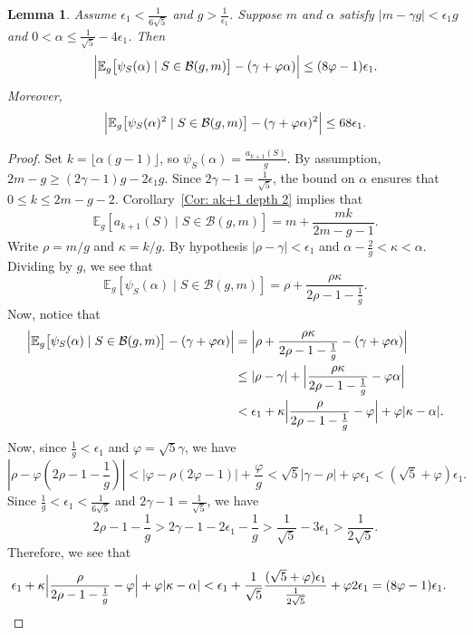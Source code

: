 \documentclass[12pt]{amsart}
\def\B{{\mathcal B}}
\def\E{{\mathbb E}}
\renewcommand{\phi}{\varphi}
\newtheorem{lemma}[theorem]{Lemma}
\begin{document}
\begin{lemma}\label{Lem: exp, var depth 2}
Assume $\epsilon_1< \frac{1}{6\sqrt{5}}$ and $g>\frac{1}{\epsilon_1}$.
Suppose $m$ and $\alpha$ satisfy $|m-\gamma g|<\epsilon_1 g$ and $0< \alpha \leq \frac{1}{\sqrt{5}} -4\epsilon_1$.
Then
\[
\Bigl|\E_g \big[\psi_S(\alpha)\mid S\in\mathcal B(g,m)\big]-(\gamma+\phi\alpha)\Bigr|
\leq (8\phi-1)\epsilon_1. \]
Moreover,
\[
\Bigl|\E_g \big[\psi_S(\alpha)^2\mid S\in\mathcal B(g,m)\big]-(\gamma+\phi\alpha)^2\Bigr|
\leq 68\epsilon_1. \]
\end{lemma}
\begin{proof}
Set $k=\lfloor \alpha (g-1)\rfloor$, so $\psi_S(\alpha)= \frac{a_{k+1}(S)}{g}$.  By assumption, $2m-g \ge (2\gamma-1)g - 2\epsilon_1 g$.  Since $2\gamma-1 = \frac{1}{\sqrt{5}}$, the bound on $\alpha$ ensures that $0\leq k\leq 2m-g-2$. 
Corollary~\ref{Cor: ak+1 depth 2} implies that
\[
\E_g[a_{k+1}(S)\mid S\in \B(g,m)] = m+\frac{mk}{2m-g-1}.
\]
Write $\rho=m/g$ and $\kappa=k/g$.  By hypothesis $|\rho-\gamma|<\epsilon_1$ and $\alpha-\frac{2}{g} <\kappa<\alpha$.
Dividing by $g$, we see that
\[
\E_g[\psi_S(\alpha)\mid S\in \B(g,m)]
= \rho+\frac{\rho\kappa}{2\rho-1-\frac{1}{g}}.
\]
Now, notice that
\begin{align*}
\Bigl|\E_g \big[\psi_S(\alpha)\mid S\in\mathcal B(g,m)\big]-(\gamma+\phi\alpha)\Bigr|
&= \Bigl| \rho+\frac{\rho \kappa}{2\rho-1-\frac{1}{g}} -(\gamma+\phi\alpha)\Bigr|\\
&\leq |\rho-\gamma| + \Bigl| \frac{\rho \kappa}{2\rho-1-\frac{1}{g}} -\phi\alpha\Bigr|\\
&<\epsilon_1 + \kappa\Bigl| \frac{\rho}{2\rho-1-\frac{1}{g}} -\phi\Bigr| 
+ \phi | \kappa - \alpha |.
\end{align*}
Now, since $\frac{1}{g}<\epsilon_1$ and $\phi=\sqrt{5}\gamma$, we have
\[
\left|\rho -\phi \left(2\rho-1-\frac{1}{g}\right)\right| < |\phi -\rho (2\phi-1)| + 
\frac{\phi}{g} 
< \sqrt{5}\left|\gamma -\rho \right|  +\phi\epsilon_1 < (\sqrt{5}+\phi)\epsilon_1.
\]
Since $\frac{1}{g}<\epsilon_1 < \frac{1}{6\sqrt{5}}$ and $2\gamma-1=\frac{1}{\sqrt{5}}$, we have
\[
2\rho-1-\frac{1}{g} > 2\gamma-1 -2\epsilon_1 -\frac{1}{g} >\frac{1}{\sqrt{5}} -3\epsilon_1 > \frac{1}{2\sqrt{5}}.
\]
Therefore, we see that
\begin{align*}
\epsilon_1 + \kappa\Bigl| \frac{\rho}{2\rho-1-\frac{1}{g}} -\phi\Bigr|  + \phi | \kappa - \alpha |
&< \epsilon_1 + \frac{1}{\sqrt{5}} \frac{(\sqrt{5}+\phi)\epsilon_1}{\frac{1}{2\sqrt{5}}} + \phi 2\epsilon_1
=(8\phi-1) \epsilon_1.
\end{align*}


\end{proof}
\end{document}
